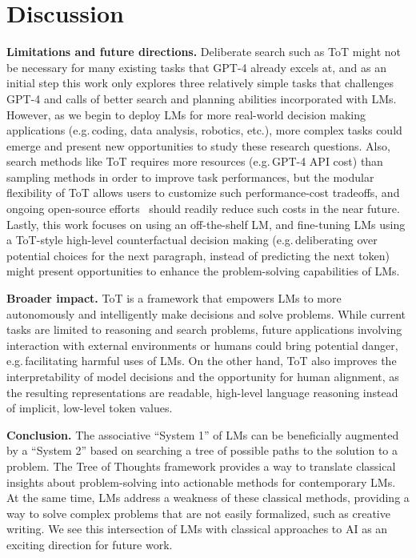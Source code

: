 \documentclass{article}
\begin{document}
\section{Discussion}


\textbf{Limitations and future directions.}
Deliberate search such as ToT might not be necessary for many existing tasks that GPT-4 already excels at, and as an initial step this work only explores three relatively simple tasks that challenges GPT-4 and calls of better search and planning abilities incorporated with LMs. However, as we begin to deploy LMs for more real-world decision making applications (e.g.\,coding, data analysis, robotics, etc.), more complex tasks could emerge and present new opportunities to study these research questions. Also, search methods like ToT requires more resources (e.g.\,GPT-4 API cost) than sampling methods in order to improve task performances, but the modular flexibility of ToT allows users to customize such performance-cost tradeoffs, and ongoing open-source efforts~\citep{touvron2023llama} should readily reduce such costs in the near future. Lastly, this work focuses on using an off-the-shelf LM, and fine-tuning LMs using a ToT-style high-level counterfactual decision making (e.g.\,deliberating over potential choices for the next paragraph, instead of predicting the next token) might present opportunities to enhance the problem-solving capabilities of LMs.


\textbf{Broader impact.} ToT is a framework that empowers LMs to more autonomously and intelligently make decisions and solve problems. While current tasks are limited to reasoning and search problems, future applications involving interaction with external environments or humans could bring potential danger, e.g.\,facilitating harmful uses of LMs. On the other hand, ToT also improves the interpretability of model decisions and the opportunity for human alignment, as the resulting representations are readable, high-level language reasoning instead of implicit, low-level token values. 


\textbf{Conclusion.} The associative ``System 1'' of LMs can be beneficially augmented by a ``System 2'' based on searching a tree of possible paths to the solution to a problem. The Tree of Thoughts framework provides a way to translate classical insights about problem-solving into actionable methods for contemporary LMs. At the same time, LMs address a weakness of these classical methods, providing a way to solve complex problems that are not easily formalized, such as creative writing. We see this intersection of LMs with classical approaches to AI as an exciting direction for future work.



\end{document}
